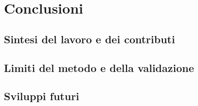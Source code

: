 \chapter{Conclusioni}
\label{chap:conclusions}

\section{Sintesi del lavoro e dei contributi}
\label{sec:conclusioni-sintesi}

\section{Limiti del metodo e della validazione}
\label{sec:conclusioni-limiti}

\section{Sviluppi futuri}
\label{sec:conclusioni-futuro}
